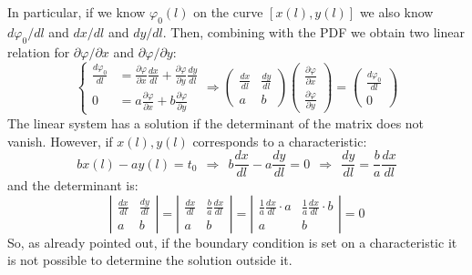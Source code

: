\documentclass{article}
\begin{document}
\noindent
In particular, if we know $\varphi_0(l)$ on the curve $[x(l), y(l)]$ we also know $d\varphi_0/dl$ and $dx/dl$ and $dy/dl$. Then, combining with the PDF we obtain two linear relation for $\partial \varphi / \partial x$ and $\partial \varphi / \partial y$:
\begin{equation}
    \left\{
\begin{aligned}
\frac{d \varphi_0}{d l} &= \frac{\partial \varphi}{\partial x} \frac{d x}{d l} + \frac{\partial \varphi}{\partial y} \frac{d y}{d l} \\
0 &= a \frac{\partial \varphi}{\partial x} + b \frac{\partial \varphi}{\partial y}
\end{aligned}
\right.
\Rightarrow
\begin{pmatrix}
\frac{d x}{d l} & \frac{d y}{d l} \\
a & b
\end{pmatrix}
\begin{pmatrix}
\frac{\partial \varphi}{\partial x} \\
\frac{\partial \varphi}{\partial y}
\end{pmatrix}
=
\begin{pmatrix}
\frac{d \varphi_0}{d l} \\
0
\end{pmatrix}
\end{equation}
The linear system has a solution if the determinant of the matrix does not vanish. However, if $x(l),y(l)$ corresponds to a characteristic:
\begin{equation}
    bx(l) - ay(l) = t_0 \ \ \Rightarrow \ \ b\frac{dx}{dl}-a\frac{dy}{dl} = 0 \ \ \Rightarrow \ \ \frac{dy}{dl} = \frac{b}{a} \frac{dx}{dl}
\end{equation}
and the determinant is:
\begin{equation}
    \left| 
\begin{array}{cc}
\frac{dx}{dl} & \frac{dy}{dl} \\
a & b
\end{array}
\right|
=
\left|
\begin{array}{cc}
\frac{dx}{dl} & \frac{b}{a} \frac{dx}{dl} \\
a & b
\end{array}
\right|
=
\left|
\begin{array}{cc}
\frac{1}{a} \frac{dx}{dl} \cdot a & \frac{1}{a} \frac{dx}{dl} \cdot b \\
a & b
\end{array}
\right|
= 0
\end{equation}
So, as already pointed out, if the boundary condition is set on a characteristic it is not possible to determine the solution outside it.
\end{document}
